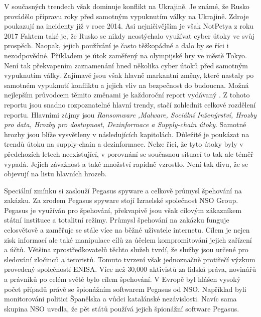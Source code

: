 V současných trendech však dominuje konflikt na Ukrajině.
Je známé, že Rusko provádělo přípravu roky před samotným vypuknutím války na Ukrajině.
Zdroje poukazují na incidenty již v roce 2014\cite{russian_cyber_usage}.
Asi nejničivějším je však NotPetya z roku 2017\cite{NotPetya}
Faktem také je, že Rusko se nikdy neostýchalo využívat cyber útoky ve svůj prospěch.
Naopak, jejich používání je často těžkopádné a dalo by se říci i nezodpovědné.
Příkladem je útok zaměřený na olympijské hry ve městě Tokyo\cite{Tokyo_olympic_attack}.
Není tak překvapením zaznamenání hned několika cyber útoků před samotným vypuknutím války\cite{before_ukranian_war_attacks}.
Zajímavé jsou však hlavně markantní změny, které nastaly po samotném vypuknutí konfliktu a jejich vliv na bezpečnost do budoucna.
Možná nejlepším průvodcem těmito změnami je každoroční report vydávaný \cite{Enisa_thread_landscape}.
Z tohoto reportu jsou snadno rozpoznatelné hlavní trendy, stačí zohlednit celkové rozdělení reportu.
Hlavními zájmy jsou \textit{Ransomware ,Malware, Sociální Inženýrství, Hrozby pro data,	Hrozby pro dostupnost, Dezinformace a Supply-chain útoky}.
Samotné hrozby jsou blíže vysvětleny v následujících kapitolách.
Důležité je poukázat na trendů útoku na supply-chain a dezinformace.
Nelze říci, že tyto útoky byly v předchozích letech neexistující, v porovnání se současnou situací to tak ale téměř vypadá.
Jejich závažnost a také množství rapidně vzrostlo.
Není tak divu, že se objevují na listu hlavních hrozeb.
~

Speciální zmínku si zaslouží Pegasus spyware a celkově průmysl špehování na zakázku.
Za zrodem Pegasus spyware stojí Izraelské společnost NSO Group.
Pegasus je využíván pro špehování, překvapivě jsou však cílovým zákazníkem státní instituce a totalitní režimy.
Průmysl špehování na zakázku funguje celosvětově a zaměřuje se stále více na běžné uživatele internetu.
Cílem je nejen zisk informací ale také manipulace cílů za účelem kompromitování jejich zařízení a účtů.
Většina zprostředkovatelů těchto služeb tvrdí, že služby jsou určené pro sledování zločinců a teroristů.
Tomuto tvrzení však jednoznačně protiřečí výzkum provedený společností \ac{ENISA}.
Více než 30,000 aktivistů za lidská práva, novinářů a právníků po celém světě bylo cílem špehování.
V Evropě byl hlášen vysoký počet případů právě se špionážním softwarem Pegasus od NSO\@.
Například byli monitorováni politici Španělska a vůdci katalánské nezávislosti.
Navíc sama skupina NSO uvedla, že pět států  používá jejich špionážní software Pegasus.\cite{Enisa_thread_landscape}

